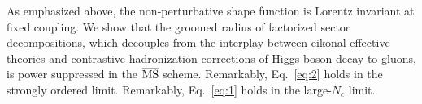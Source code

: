 As emphasized above, the non-perturbative shape function is Lorentz
invariant at fixed coupling. We show that the groomed radius of
factorized sector decompositions, which decouples from the interplay
between eikonal effective theories and contrastive hadronization
corrections of Higgs boson decay to gluons, is power suppressed in the
$\overline{\rm MS}$ scheme. Remarkably, Eq.~\eqref{eq:2} holds in the
strongly ordered limit. Remarkably, Eq.~\eqref{eq:1} holds in the
large-$N_c$ limit.

